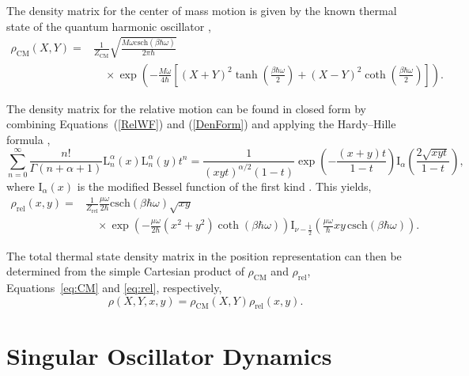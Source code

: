 \documentclass[preprints,article,accept,moreauthors,pdftex]{Definitions/mdpi}
\begin{document}
The density matrix for the center of mass motion is given by the known thermal state of the quantum harmonic oscillator \cite{Greiner1995},
\begin{equation}
\label{eq:CM}
	\begin{split}
	\rho_{\mathrm{CM}}(X,Y) = & \frac{1}{Z_{\mathrm{CM}}} \sqrt{\frac{M \omega  \text{csch}(\beta \hbar \omega)}{2 \pi \hbar}} \\
	& \quad \times \exp \left(-\frac{M \omega}{4 \hbar} \left[(X+Y)^2 \tanh \left(\frac{\beta \hbar \omega}{2}\right)+(X-Y)^2 \coth \left(\frac{\beta \hbar \omega}{2}\right)\right]\right).
	\end{split}
\end{equation}

The density matrix for the relative motion can be found in closed form by combining Equations~(\ref{RelWF}) and (\ref{DenForm}) and applying the Hardy–Hille formula \cite{Bateman1953},
\begin{equation}
	\sum_{n = 0}^{\infty} \frac{n!}{\Gamma(n+\alpha+1)}\mathrm{L}_n^{\alpha}(x)\mathrm{L}_n^{\alpha}(y)t^n = \frac{1}{(xyt)^{\alpha/2}(1-t)}\exp\left(-\frac{(x+y)t}{1-t}\right)\mathrm{I}_{\alpha}\left(\frac{2\sqrt{xyt}}{1-t}\right), 
\end{equation}
where $\mathrm{I}_{\alpha}(x)$ is the modified Bessel function of the first kind \cite{AbramowitzBook}. This yields,
\begin{equation}
\label{eq:rel}
	\begin{split}
	\rho_{\mathrm{rel}}(x,y) = & \frac{1}{Z_{\mathrm{rel}}}\frac{\mu  \omega}{2\hbar}  \text{csch}(\beta \hbar \omega) \sqrt{x y} \\
	& \quad \times \exp\left(-\frac{\mu  \omega}{2 \hbar }  \left(x^2+y^2\right) \coth (\beta \hbar \omega)\right) \mathrm{I}_{\nu -\frac{1}{2}}\left(\frac{\mu \omega}{\hbar} x y \, \text{csch}(\beta \hbar \omega)\right).
	\end{split}
\end{equation}

The total thermal state density matrix in the position representation can then be determined from the simple Cartesian product of $\rho_{\mathrm{CM}}$ and $\rho_{\mathrm{rel}}$, Equations~\eqref{eq:CM} and \eqref{eq:rel}, respectively, 
\begin{equation}
\rho(X,Y,x,y) = \rho_{\mathrm{CM}}(X,Y) \rho_{\mathrm{rel}}(x,y).
\end{equation}                                 

\section{Singular Oscillator Dynamics}
\end{document}
